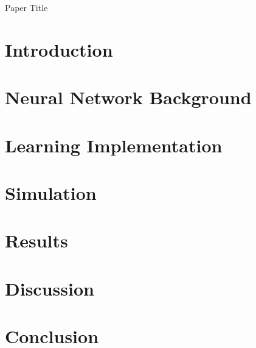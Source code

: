 \documentclass[letterpaper,12pt]{article}
\begin{document}
\begin{titlepage}
	\begin{center}
		{\LARGE Paper Title}
	\end{center}
	
\end{titlepage}

\pagebreak

\section{Introduction}



\section{Neural Network Background}



\section{Learning Implementation}



\section{Simulation}



\section{Results}



\section{Discussion}



\section{Conclusion}



\nocite{wirefit,qlearn,backprop,practical,tutorial,kinematics}

\pagebreak


\end{document}
